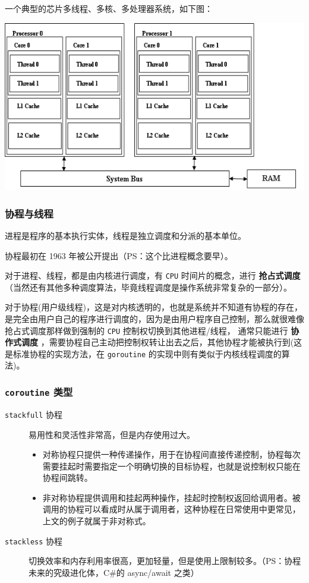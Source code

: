 \documentclass[UTF8]{ctexart}
\begin{document}
一个典型的芯片多线程、多核、多处理器系统，如下图：

\begin{center}
\includegraphics[width=.9\linewidth]{./multicore_mp_system.png}
\end{center}
\subsubsection{协程与线程}
\label{sec:org25ffeb8}
进程是程序的基本执行实体，线程是独立调度和分派的基本单位。

协程最初在 1963 年被公开提出（PS：这个比进程概念要早）。

对于进程、线程，都是由内核进行调度，有 \texttt{CPU} 时间片的概念，进行 \textbf{抢占式调度} （当然还有其他多种调度算法，毕竟线程调度是操作系统非常复杂的一部分）。

    对于协程(用户级线程)，这是对内核透明的，也就是系统并不知道有协程的存在，是完全由用户自己的程序进行调度的，因为是由用户程序自己控制，那么就很难像抢占式调度那样做到强制的 \texttt{CPU} 控制权切换到其他进程/线程，
通常只能进行 \textbf{协作式调度} ，需要协程自己主动把控制权转让出去之后，其他协程才能被执行到(这是标准协程的实现方法，在 \texttt{goroutine} 的实现中则有类似于内核线程调度的算法)。
\subsubsection{\texttt{coroutine} 类型}
\label{sec:orgf9f242f}
\begin{description}
\item[{\texttt{stackfull} 协程}] 易用性和灵活性非常高，但是内存使用过大。
\begin{itemize}
\item 对称协程只提供一种传递操作，用于在协程间直接传递控制，协程每次需要挂起时需要指定一个明确切换的目标协程，也就是说控制权只能在协程间跳转。
\item 非对称协程提供调用和挂起两种操作，挂起时控制权返回给调用者。被调用的协程可以看成时从属于调用者，这种协程在日常使用中更常见，上文的例子就属于非对称式。
\end{itemize}
\item[{\texttt{stackless} 协程}] 切换效率和内存利用率很高，更加轻量，但是使用上限制较多。（PS：协程未来的究级进化体，C\#的 async/await 之类）
\end{description}
\end{document}
